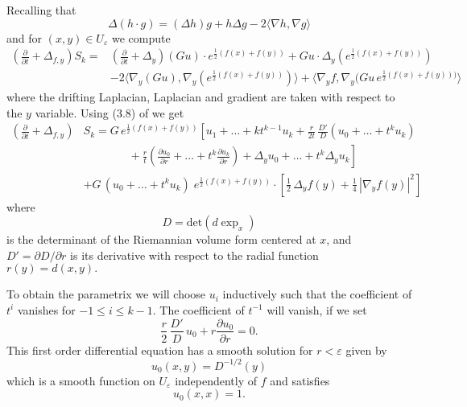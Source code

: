 \documentclass[letterpaper,12pt]{amsart}
\newcommand{\eps}{\varepsilon}
\def \<{\langle}
\def \>{\rangle}
\def \p{\partial}
\def \n{\nabla}
\def \n{\nabla}
\begin{document}
Recalling that
\[
\Delta(h\cdot g)= (\Delta h) g + h \Delta g - 2\< \n h, \n g\>
\]
and for $(x,y)\in U_\eps$ we compute
\begin{equation*}
\begin{split}
 \left( \frac{\p}{\p t} + \Delta_{f,y} \right)  S_k  = &  \left( \frac{\p}{\p t} + \Delta_y \right)  (G u) \cdot  e^{\frac 12 (f(x)+f(y))}+
 G u \cdot \Delta_y  (e^{\frac 12 (f(x)+f(y))})\\
 & - 2 \< \n_y   (G u ), \n_y   (e^{\frac 12 (f(x)+f(y))}) \> + \<  \n_y   f,  \n_y   (G u \,e^{\frac 12 (f(x)+f(y)))} \>
\end{split}
\end{equation*}
where the drifting Laplacian, Laplacian and gradient are taken with respect to the $y$ variable.  Using (3.8) of \cite{Ro} we get
\begin{equation} \label{heat1}
\begin{split}
 \left( \frac{\p}{\p t} + \Delta_{f,y} \right) & S_k  =  G \,e^{\frac{1}{2} (f(x)+f(y))} \left[ u_1 + \ldots + k t^{k-1} u_k + \frac{r}{2 t}\, \frac{D'}{D} (u_0 + \ldots +  t^{k} u_k) \right.  \\
&  \qquad \qquad  +\left. \frac{r}{t} \left(\frac{\p u_0}{\p r} + \ldots + t^k\frac{\p u_k}{\p r}\right) + \Delta_y u_0 + \ldots + t^k \Delta_y u_k \right]     \\
 & + G \, (u_0 + \ldots + t^k u_k) \; e^{\frac 12 (f(x)+f(y))} \cdot \left[ \frac 12 \, \Delta_y f (y) + \frac 14 \, |\n_y f(y)|^2 \right]
\end{split}
\end{equation}
where
\[
D=\text{det}(d \exp_x)
\]
is the determinant of the Riemannian volume form centered at $x$, and $D' = \p D/ \p r$ is its derivative with respect to the radial function $r(y)=d(x,y).$

To obtain the parametrix we will choose $u_i$ inductively such that the coefficient of $t^i$ vanishes for $-1\leq i \leq k-1$. The coefficient of $t^{-1}$ will vanish, if we set
\[
\frac{r}{2}\, \frac{D'}{D} \, u_0 + r \frac {\p u_0}{\p r} =0.
\]
This first order differential equation has a smooth solution for $r<\eps$ given by
\[
u_0(x,y) = D^{-1/2}(y)
\]
which is a smooth function on $U_\eps$ independently of $f$ and satisfies
\[
u_0(x,x)=1.
\]
\end{document}
